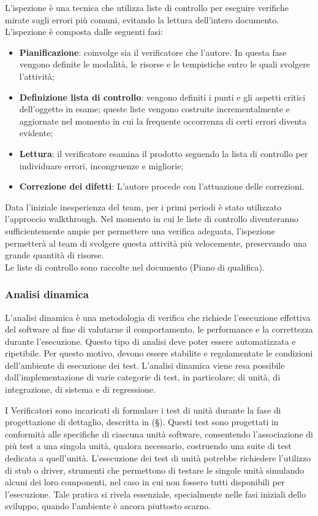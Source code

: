 \documentclass[10pt, a4paper]{article}
\begin{document}
 L'ispezione è una tecnica che utilizza liste di controllo per eseguire verifiche mirate sugli errori più comuni, evitando la lettura dell'intero documento. L'ispezione è composta dalle seguenti fasi:
\begin{itemize}
    \item \textbf{Pianificazione}: coinvolge sia il verificatore che l'autore. In questa fase vengono definite le modalità, le risorse e le tempistiche entro le quali svolgere l'attività;
    \item \textbf{Definizione lista di controllo}: vengono definiti i punti e gli aspetti critici dell'oggetto in esame; queste liste vengono costruite incrementalmente e aggiornate nel momento in cui la frequente occorrenza di certi errori diventa evidente;
    \item \textbf{Lettura}: il verificatore esamina il prodotto seguendo la lista di controllo per individuare errori, incongruenze e migliorie;
    \item \textbf{Correzione dei difetti}: L'autore procede con l'attuazione delle correzioni.
\end{itemize}

Data l'iniziale inesperienza del team, per i primi periodi è stato utilizzato l'approccio walkthrough.
Nel momento in cui le liste di controllo diventeranno sufficientemente ampie per permettere una verifica adeguata, l'ispezione permetterà al team di svolgere questa attività più velocemente, preservando una grande quantità di risorse.\\
Le liste di controllo sono raccolte nel documento (Piano di qualifica).

\subsubsection{Analisi dinamica}
L'analisi dinamica è una metodologia di verifica che richiede l'esecuzione effettiva del software al fine di valutarne il comportamento, le performance e la correttezza durante l'esecuzione.
Questo tipo di analisi deve poter essere automatizzata e ripetibile. Per questo motivo, devono essere stabilite e regolamentate le condizioni dell'ambiente di esecuzione dei test. 
L'analisi dinamica viene resa possibile dall'implementazione di varie categorie di test, in particolare: di unità, di integrazione, di sistema e di regressione.

I Verificatori sono incaricati di formulare i test di unità durante la fase di progettazione di dettaglio, descritta in (\S {}). Questi test sono progettati in conformità alle specifiche di ciascuna unità software, consentendo l'associazione di più test a una singola unità, qualora necessario, costruendo una suite di test dedicata a quell'unità.
L'esecuzione dei test di unità potrebbe richiedere l'utilizzo di stub o driver, strumenti che permettono di testare le singole unità simulando alcuni dei loro componenti, nel caso in cui non fossero tutti disponibili per l'esecuzione.
Tale pratica si rivela essenziale, specialmente nelle fasi iniziali dello sviluppo, quando l'ambiente è ancora piuttosto scarno.
\end{document}
